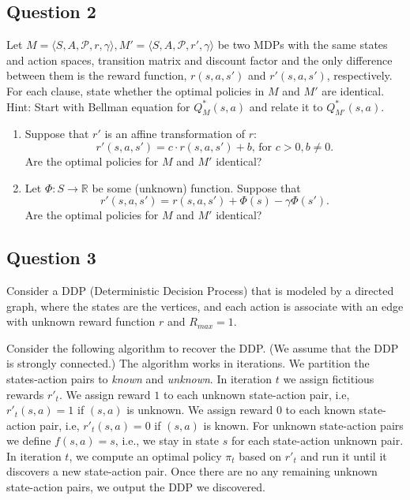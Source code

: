 \documentclass[11pt]{article}
\begin{document}
\subsection{Question 2}
Let $M=\langle S,A,\mathcal{P},r,\gamma \rangle, M'=\langle S,A,\mathcal{P},r',\gamma \rangle$ be two MDPs with the same states and action spaces, transition matrix and discount factor and the only difference between them is the reward function, $r(s,a,s')$ and $r'(s,a,s')$, respectively. For each clause, state whether the optimal policies in $M$ and $M'$ are identical. Hint: Start with Bellman equation for $Q^{*}_M(s, a)$ and relate it to $Q^{*}_{M'}(s, a)$.
\begin{enumerate}[label=(\alph*)]
\item Suppose that $r'$ is an affine transformation of $r$:
$$r'(s, a, s')=c\cdot r(s, a, s') +b \text{, for }c>0,b\ne 0.$$
Are the optimal policies for $M$ and $M'$ identical?\\

\item Let  $\Phi:S\rightarrow \mathbb{R}$ be some (unknown) function. Suppose that $$r'(s, a, s') = r(s, a, s') + \Phi(s)-\gamma \Phi(s').$$ 
Are the optimal policies for $M$ and $M'$ identical?\\

\end{enumerate}



\subsection{Question 3}
Consider a DDP (Deterministic Decision Process) that is modeled by a directed graph, where
the states are the vertices, and each action is associate with an edge with unknown reward function $r$ and $R_{max}=1$.

Consider the following algorithm to recover the DDP. (We assume that the DDP is strongly connected.)
The algorithm works in iterations. 
We partition the states-action pairs to {\em known} and {\it unknown}.
In iteration $t$ we assign fictitious rewards $r'_t$. We assign reward $1$ to each unknown state-action pair, i.e,  $r'_t(s,a)=1$ if $(s,a)$ is unknown. We assign reward $0$ to each known state-action pair, i.e,  $r'_t(s,a)=0$ if $(s,a)$ is known. For unknown state-action pairs we define $f(s,a)=s$, i.e., we stay in state $s$ for each state-action unknown pair. 
In iteration $t$, we compute an optimal policy $\pi_t$ based on $r'_t$ and run it until it discovers a new state-action pair. Once there are no any remaining unknown state-action pairs, we output the DDP we discovered.
\end{document}
